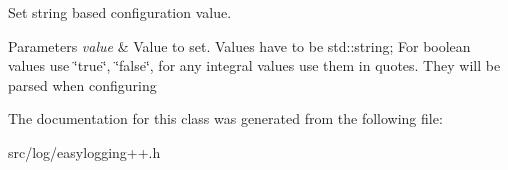 Set string based configuration value. 


\begin{DoxyParams}{Parameters}
{\em value} & Value to set. Values have to be std\+::string; For boolean values use \char`\"{}true\char`\"{}, \char`\"{}false\char`\"{}, for any integral values use them in quotes. They will be parsed when configuring \\
\hline
\end{DoxyParams}


The documentation for this class was generated from the following file\+:\begin{DoxyCompactItemize}
\item 
src/log/easylogging++.\+h\end{DoxyCompactItemize}
